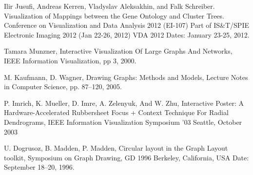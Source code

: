 
\begin{thebibliography}{99}

Ilir Jusufi, Andreas Kerren, Vladyslav Aleksakhin, and Falk Schreiber. Visualization of Mappings between the Gene Ontology and Cluster Trees. Conference on Visualization and Data Analysis 2012 (EI-107) Part of IS&T/SPIE Electronic Imaging 2012 (Jan 22-26, 2012) VDA 2012 Dates: January 23-25, 2012.

Tamara Munzner, Interactive Visualization Of Large Graphs And Networks, IEEE Information Visualization, pp 3, 2000.


 M. Kaufmann, D. Wagner, Drawing Graphs: Methods and Models, Lecture Notes in Computer Science, pp. 87–120, 2005.

P. Imrich, K. Mueller, D. Imre, A. Zelenyuk, And W. Zhu, Interactive Poster: A Hardware-Accelerated Rubbersheet Focus + Context Technique For Radial Dendrograms, IEEE Information Visualization Symposium '03 Seattle, October 2003

U. Dogrusoz, B. Madden, P. Madden, Circular layout in the Graph Layout toolkit, Symposium on Graph Drawing, GD 1996 Berkeley, California, USA Date: September 18–20, 1996.









\end{thebibliography}
